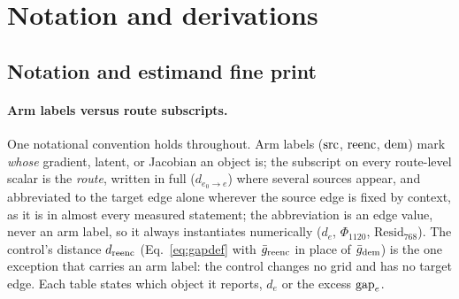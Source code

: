 \appendix

\section{Notation and derivations}
\label{app:derivations}

\subsection{Notation and estimand fine print}
\label{app:notation}

\paragraph{Arm labels versus route subscripts.}
One notational convention holds throughout. Arm labels ($\mathrm{src}$,
$\mathrm{reenc}$, $\mathrm{dem}$) mark \emph{whose} gradient, latent, or Jacobian an
object is; the subscript on every route-level scalar is the
\emph{route}, written in full ($d_{e_0 \to e}$) where several sources
appear, and abbreviated to the target edge alone wherever the source
edge is fixed by context, as it is in almost every measured
statement; the abbreviation is an edge value, never an arm label, so
it always instantiates numerically ($d_e$, $\Phi_{1120}$,
$\mathrm{Resid}_{768}$). The
control's distance $d_{\mathrm{reenc}}$ (Eq.~\ref{eq:gapdef} with
$\bar g_{\mathrm{reenc}}$ in place of $\bar g_{\mathrm{dem}}$) is the one exception that
carries an arm label: the control changes no grid and has no target
edge. Each table states which object it reports, $d_e$ or the excess
$\mathrm{gap}_e$.


